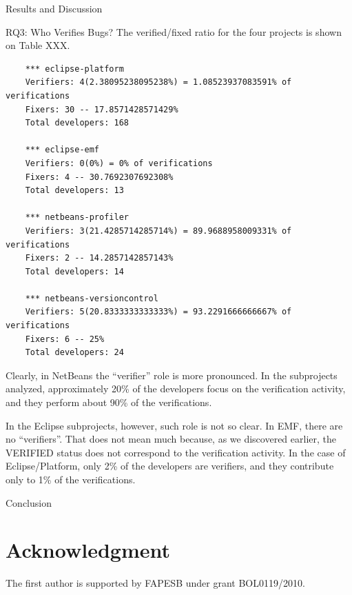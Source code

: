 \begin{section}{Results and Discussion}
\begin{subsection}{RQ3: Who Verifies Bugs?}
	The verified/fixed ratio for the four projects is shown on Table XXX.
	
\begin{verbatim}
	*** eclipse-platform 
	Verifiers: 4(2.38095238095238%) = 1.08523937083591% of verifications
	Fixers: 30 -- 17.8571428571429%
	Total developers: 168 

	*** eclipse-emf 
	Verifiers: 0(0%) = 0% of verifications
	Fixers: 4 -- 30.7692307692308%
	Total developers: 13 

	*** netbeans-profiler 
	Verifiers: 3(21.4285714285714%) = 89.9688958009331% of verifications
	Fixers: 2 -- 14.2857142857143%
	Total developers: 14 

	*** netbeans-versioncontrol 
	Verifiers: 5(20.8333333333333%) = 93.2291666666667% of verifications
	Fixers: 6 -- 25%
	Total developers: 24
\end{verbatim}
	
	Clearly, in NetBeans the ``verifier'' role is more pronounced. In the subprojects analyzed, approximately 20\% of the developers focus on the verification activity, and they perform about 90\% of the verifications.
	
	In the Eclipse subprojects, however, such role is not so clear. In EMF, there are no ``verifiers''. That does not mean much because, as we discovered earlier, the VERIFIED status does not correspond to the verification activity. In the case of Eclipse/Platform, only 2\% of the developers are verifiers, and they contribute only to 1\% of the verifications.
	
\end{subsection}

\end{section}



\begin{section}{Conclusion}
	
\end{section}

\section*{Acknowledgment}

The first author is supported by FAPESB under grant BOL0119/2010.

